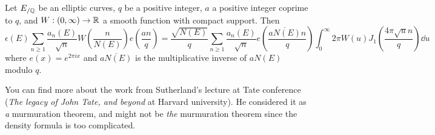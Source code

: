 \begin{theorem}
    Let $E_{/\mathbb{Q}}$ be an elliptic curves, $q$ be a positive integer, $a$ a positive integer coprime to $q$, and $W: (0, \infty) \to \mathbb{R}$ a smooth function with compact support.
    Then
    \begin{equation}
        \epsilon(E) \sum_{n \ge 1} \frac{a_n(E)}{\sqrt{n}} W\left(\frac{n}{N(E)}\right) e\left(\frac{an}{q}\right) = \frac{\sqrt{N(E)}}{q} \sum_{n \ge 1} \frac{a_n(E)}{\sqrt{n}} e\left(\frac{\overline{aN(E)} n}{q}\right) \int_0^{\infty} 2 \pi W(u) J_1\left(\frac{4 \pi \sqrt{u}n}{q}\right) \dd u
    \end{equation}
    where $e(x) = e^{2 \pi i x}$ and $\overline{aN(E)}$ is the multiplicative inverse of $aN(E)$ modulo $q$.
\end{theorem}


You can find more about the work from Sutherland's lecture \cite{sutherland} at Tate conference (\emph{The legacy of John Tate, and beyond} at Harvard university).
He considered it as \emph{a} murmuration theorem, and might not be \emph{the} murmuration theorem since the density formula is too complicated.